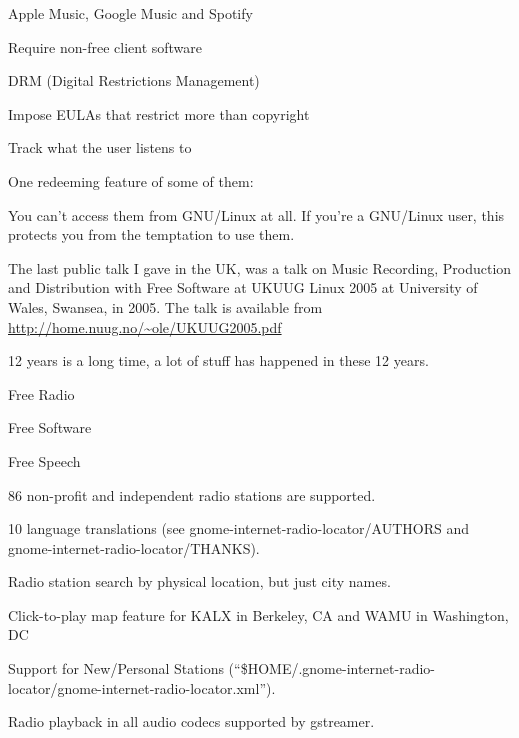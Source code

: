 \documentclass[20pt,landscape]{foils}
\begin{document}

\begin{list1}
\item Apple Music, Google Music and Spotify
  \begin{list2}
  \item Require non-free client software
  \item DRM (Digital Restrictions Management)
  \item Impose EULAs that restrict more than copyright
  \item Track what the user listens to
  \end{list2}
\end{list1}

One redeeming feature of some of them:

\begin{list2}
\item You can't access them from GNU/Linux at all.  If you're a GNU/Linux user, this protects you from the temptation to use them.
\end{list2}


The last public talk I gave in the UK, was a talk on Music Recording, Production and Distribution with Free Software at UKUUG Linux 2005 at University of Wales, Swansea, in 2005. The talk is available from \url{http://home.nuug.no/~ole/UKUUG2005.pdf}

12 years is a long time, a lot of stuff has happened in these 12 years.

\begin{list1}
\item Free Radio
\item Free Software
\item Free Speech
\end{list1}


\begin{list1}
\item 86 non-profit and independent radio stations are supported.
\item 10 language translations (see gnome-internet-radio-locator/AUTHORS and gnome-internet-radio-locator/THANKS).
\item Radio station search by physical location, but just city names.
\item Click-to-play map feature for KALX in Berkeley, CA and WAMU in Washington, DC
\item Support for New/Personal Stations (``\$HOME/.gnome-internet-radio-locator/gnome-internet-radio-locator.xml'').
\item Radio playback in all audio codecs supported by gstreamer.
\end{list1}
\end{document}
